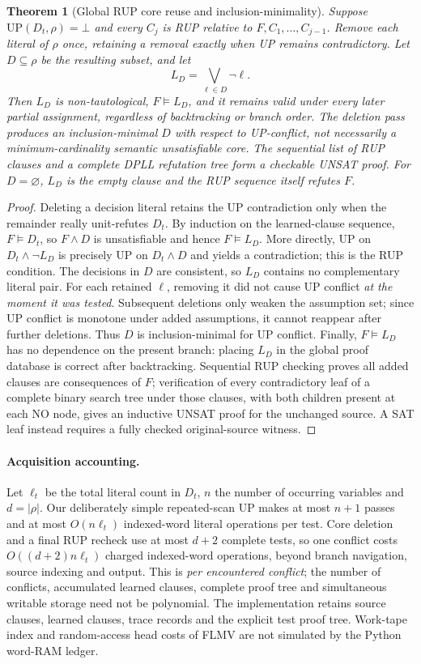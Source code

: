 \documentclass[10pt]{article}
\newtheorem{theorem}{Theorem}
\begin{document}
\begin{theorem}[Global RUP core reuse and inclusion-minimality]
Suppose $\mathrm{UP}(D_t,\rho)=\bot$ and every $C_j$ is RUP relative to
$F,C_1,\ldots,C_{j-1}$. Remove each literal of $\rho$ once, retaining a removal
exactly when UP remains contradictory. Let $D\subseteq\rho$ be the resulting
subset, and let
\[
 L_D=\bigvee_{\ell\in D}\neg\ell.
\]
Then $L_D$ is non-tautological, $F\models L_D$, and it remains valid under
\emph{every} later partial assignment, regardless of backtracking or branch
order. The deletion pass produces an inclusion-minimal $D$ with respect to
UP-conflict, not necessarily a minimum-cardinality semantic unsatisfiable core.
The sequential list of RUP clauses and a complete DPLL refutation tree form a
checkable UNSAT proof. For $D=\varnothing$, $L_D$ is the empty clause and the
RUP sequence itself refutes $F$.
\end{theorem}
\begin{proof}
Deleting a decision literal retains the UP contradiction only when the
remainder really unit-refutes $D_t$. By induction on the learned-clause
sequence, $F\models D_t$, so $F\land D$ is unsatisfiable and hence
$F\models L_D$. More directly, UP on $D_t\land\neg L_D$ is precisely
UP on $D_t\land D$ and yields a contradiction; this is the RUP condition.
The decisions in $D$ are consistent, so $L_D$ contains no complementary
literal pair. For each retained $\ell$, removing it did not cause UP conflict
\emph{at the moment it was tested}. Subsequent deletions only weaken the
assumption set; since UP conflict is monotone under added assumptions, it
cannot reappear after further deletions. Thus $D$ is inclusion-minimal for
UP conflict. Finally, $F\models L_D$ has no dependence on the present branch:
placing $L_D$ in the global proof database is correct after backtracking.
Sequential RUP checking proves all added clauses are consequences of $F$;
verification of every contradictory leaf of a complete binary search tree
under those clauses, with both children present at each NO node, gives an
inductive UNSAT proof for the unchanged source. A SAT leaf instead requires a
fully checked original-source witness.
\end{proof}

\paragraph{Acquisition accounting.} Let $\ell_t$ be the total literal count
in $D_t$, $n$ the number of occurring variables and $d=|\rho|$. Our deliberately
simple repeated-scan UP makes at most $n+1$ passes and at most $O(n\ell_t)$
indexed-word literal operations per test. Core deletion and a final RUP
recheck use at most $d+2$ complete tests, so one conflict costs
$O((d+2)n\ell_t)$ charged indexed-word operations, beyond branch navigation,
source indexing and output. This is \emph{per encountered conflict}; the
number of conflicts, accumulated learned clauses, complete proof tree and
simultaneous writable storage need not be polynomial. The implementation
retains source clauses, learned clauses, trace records and the explicit test
proof tree. Work-tape index and random-access head costs of FLMV are not
simulated by the Python word-RAM ledger.
\end{document}
